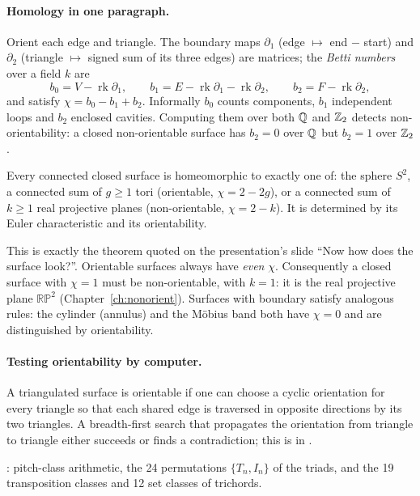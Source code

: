\paragraph{Homology in one paragraph.} Orient each edge and triangle. The boundary maps
$\partial_1$ (edge $\mapsto$ end $-$ start) and $\partial_2$ (triangle $\mapsto$ signed sum of its three edges)
are matrices; the \emph{Betti numbers} over a field $k$ are
\[
b_0=V-\operatorname{rk}\partial_1,\qquad b_1=E-\operatorname{rk}\partial_1-\operatorname{rk}\partial_2,\qquad
b_2=F-\operatorname{rk}\partial_2,
\]
and satisfy $\chi=b_0-b_1+b_2$. Informally $b_0$ counts components, $b_1$ independent loops and $b_2$ enclosed
cavities. Computing them over both $\mathbb{Q}$ and $\mathbb{Z}_2$ detects non-orientability: a closed non-orientable surface
has $b_2=0$ over $\mathbb{Q}$ but $b_2=1$ over $\mathbb{Z}_2$.

\begin{theorem}\label{thm:classification}
Every connected closed surface is homeomorphic to exactly one of: the sphere $S^2$, a connected sum of $g\ge1$ tori
(orientable, $\chi=2-2g$), or a connected sum of $k\ge1$ real projective planes (non-orientable, $\chi=2-k$).
It is determined by its Euler characteristic and its orientability.
\end{theorem}
This is exactly the theorem quoted on the presentation's slide ``Now how does the surface look?''. Orientable
surfaces always have \emph{even} $\chi$. Consequently a closed surface with $\chi=1$ must be non-orientable, with
$k=1$: it is the real projective plane $\mathbb{RP}^2$ (Chapter~\ref{ch:nonorient}). Surfaces with boundary
satisfy analogous rules: the cylinder (annulus) and the M\"obius band both have $\chi=0$ and are distinguished
by orientability.

\paragraph{Testing orientability by computer.} A triangulated surface is orientable if one can choose a cyclic
orientation for every triangle so that each shared edge is traversed in opposite directions by its two
triangles. A breadth-first search that propagates the orientation from triangle to triangle either succeeds or
finds a contradiction; this is  in .

\begin{notebookbox}
: pitch-class arithmetic, the 24 permutations $\{T_n,I_n\}$ of the triads, and the
19 transposition classes and 12 set classes of trichords.
\end{notebookbox}

